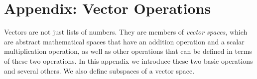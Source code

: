 

\section{Appendix: Vector Operations}\label{S:LinearAlgebraAppendix}


   Vectors are not just lists of numbers. They are members of \emph{vector 
spaces}, which are abstract mathematical spaces that have an addition operation 
and a scalar multiplication operation, as well as other operations that can be 
defined in terms of these two operations. In this appendix we introduce these 
two basic operations and several others. We also define subspaces of a vector
space.
   
